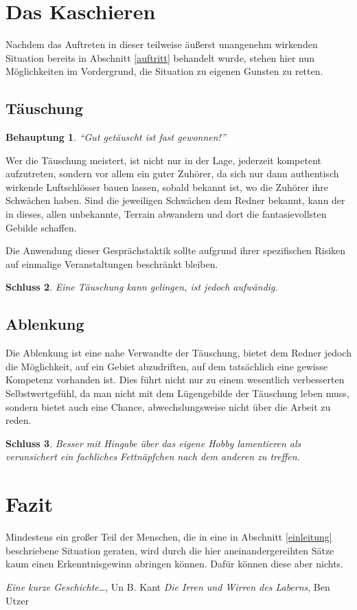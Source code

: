 \documentclass{article}
\newtheorem{beh}{Behauptung}[subsection]
\newtheorem{sch}[beh]{Schluss}
\begin{document}
\section{Das Kaschieren}\label{kaschieren}
  Nachdem das Auftreten in dieser teilweise äußerst unangenehm wirkenden
  Situation bereits in Abschnitt \ref{auftritt} behandelt wurde, stehen hier
  nun Möglichkeiten im Vordergrund, die Situation zu eigenen Gunsten zu retten.

  \subsection{Täuschung}\label{kaschieren_taeuschung}
    \begin{beh}
      "`Gut getäuscht ist fast gewonnen!"' \cite{bu-iwl}
    \end{beh}
    Wer die Täuschung meistert, ist nicht nur in der Lage, jederzeit kompetent
    aufzutreten, sondern vor allem ein guter Zuhörer, da sich nur dann
    authentisch wirkende Luftschlösser bauen lassen, sobald bekannt ist, wo
    die Zuhörer ihre Schwächen haben. Sind die jeweiligen Schwächen dem Redner
    bekannt, kann der in dieses, allen unbekannte, Terrain abwandern und dort
    die fantasievollsten Gebilde schaffen.

    Die Anwendung dieser Gesprächstaktik sollte aufgrund ihrer spezifischen
    Risiken auf einmalige Veranstaltungen beschränkt bleiben.
    \begin{sch}
      Eine Täuschung kann gelingen, ist jedoch aufwändig.
    \end{sch}

  \subsection{Ablenkung}\label{kaschieren_ablenkung}
    Die Ablenkung ist eine nahe Verwandte der Täuschung, bietet dem Redner
    jedoch die Möglichkeit, auf ein Gebiet abzudriften, auf dem tatsächlich
    eine gewisse Kompetenz vorhanden ist. Dies führt nicht nur zu einem
    wesentlich verbesserten Selbstwertgefühl, da man nicht mit dem Lügengebilde
    der Täuschung leben muss, sondern bietet auch eine Chance,
    abwechslungsweise nicht über die Arbeit zu reden.
    \begin{sch}
      Besser mit Hingabe über das eigene Hobby lamentieren als verunsichert
      ein fachliches Fettnäpfchen nach dem anderen zu treffen.
    \end{sch}

    \section{Fazit}\label{fazit}
  Mindestens ein großer Teil der Menschen, die in eine in Abschnitt
  \ref{einleitung} beschriebene Situation geraten, wird durch die hier
  aneinandergereihten Sätze kaum einen Erkenntnisgewinn abringen können. Dafür
  können diese aber nichts.

\begin{thebibliography}{[11]}
   {\slshape Eine kurze Geschichte\ldots}, Un B. Kant
   {\slshape Die Irren und Wirren des Laberns}, Ben Utzer
\end{thebibliography}
\end{document}
